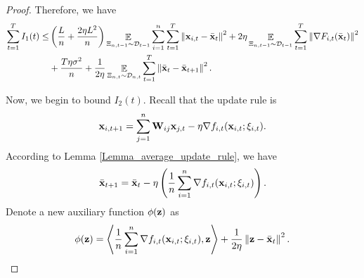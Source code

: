 \documentclass{article}
\begin{document}
\begin{proof}
Therefore, we have 
\begin{align}
\nonumber
\sum_{t=1}^T I_1(t) \le &  \left(  \frac{L}{n} + \frac{2\eta L^2}{n}  \right)\mathop{\mathbb{E}}_{ \Xi_{n,t-1} \sim \mathcal{D}_{t-1} }\sum_{i=1}^n\sum_{t=1}^T\left\lVert{\bf x}_{i,t} - \bar{{\bf x}}_t \right\rVert^2   + 2\eta  \mathop{\mathbb{E}}_{ \Xi_{n,t-1} \sim \mathcal{D}_{t-1} }\sum_{t=1}^T\left\lVert\nabla F_{i,t}(\bar{{\bf x}}_t)\right\rVert^2 \\ \nonumber 
&+ \frac{T\eta  \sigma^2}{n} +  \frac{1}{2\eta} \mathop{\mathbb{E}}_{ \Xi_{n,t} \sim \mathcal{D}_{n,t} }\sum_{t=1}^T\left\lVert \bar{{\bf x}}_t - \bar{{\bf x}}_{t+1}\right\rVert^2.
\end{align} 




Now, we begin to bound $I_2(t)$. Recall that the update rule is 
\begin{align}
\nonumber
{\bf x}_{i,t+1} = \sum_{j=1}^n {\bf W}_{ij}{\bf x}_{j,t} - \eta \nabla f_{i,t}({\bf x}_{i,t};\xi_{i,t}).
\end{align}  According to Lemma \ref{Lemma_average_update_rule}, we have 
\begin{align}
\label{equa_thoerem_update_rule_equivalent}
\bar{{\bf x}}_{t+1} = \bar{{\bf x}}_t - \eta \left( \frac{1}{n}\sum_{i=1}^n \nabla f_{i,t}({\bf x}_{i,t};\xi_{i,t}) \right).
\end{align} 
Denote a new auxiliary function $\phi({\bf z})$ as 
\begin{align}
\nonumber
\phi({\bf z}) = \left\langle\frac{1}{n}\sum_{i=1}^n \nabla f_{i,t}({\bf x}_{i,t};\xi_{i,t}), {\bf z} \right\rangle + \frac{1}{2\eta}\left\lVert{\bf z} - \bar{{\bf x}}_t\right\rVert^2.
\end{align} 


\end{proof}
\end{document}
